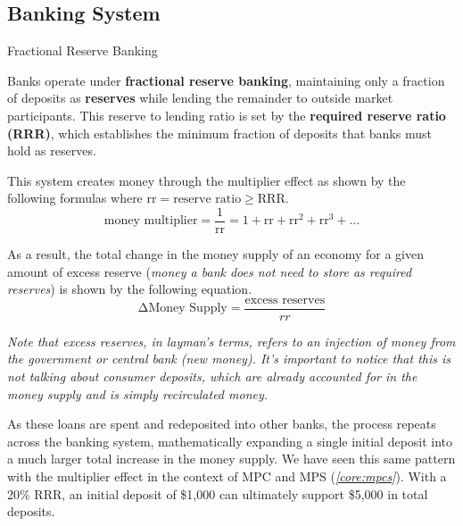 \documentclass[10pt]{article}
\begin{document}
  \subsection{Banking System}

    \begin{core}[label=core:frac_banking]{Fractional Reserve Banking}

      Banks operate under \textbf{fractional reserve banking}, maintaining only a fraction of deposits as \textbf{reserves} while lending the remainder to outside market participants. This reserve to lending ratio is set by the \textbf{required reserve ratio (RRR)}, which establishes the minimum fraction of deposits that banks must hold as reserves.

      This system creates money through the multiplier effect as shown by the following formulas where $\text{rr} = \text{reserve ratio} \geq \text{RRR}$.
      \[
        \text{money multiplier} = \frac{1}{\text{rr}} = 1 + \text{rr} + \text{rr}^2 + \text{rr}^3 + \ldots
      \]

      As a result, the total change in the money supply of an economy for a given amount of excess reserve (\textit{money a bank does not need to store as required reserves}) is shown by the following equation.
      \[
        \text{ΔMoney Supply} = \frac{\text{excess reserves}}{rr}
      \]

      \textit{Note that excess reserves, in layman's terms, refers to an injection of money from the government or central bank (new money). It's important to notice that this is not talking about consumer deposits, which are already accounted for in the money supply and is simply recirculated money.}

      As these loans are spent and redeposited into other banks, the process repeats across the banking system, mathematically expanding a single initial deposit into a much larger total increase in the money supply. We have seen this same pattern with the multiplier effect in the context of MPC and MPS (\textit{\autoref{core:mpcs}}). With a 20\% RRR, an initial deposit of \$1,000 can ultimately support \$5,000 in total deposits.

    \end{core}
\end{document}
